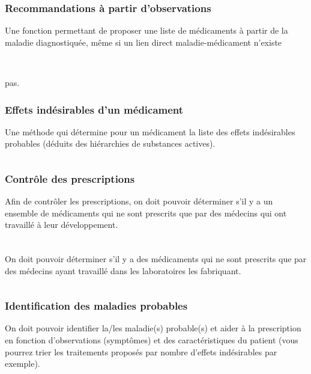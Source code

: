 \documentclass[12pt,a4paper]{article}
\begin{document}
\subsubsection{Recommandations à partir d'observations}
Une fonction permettant de proposer une liste de médicaments à partir de la maladie diagnostiquée, même si un lien direct maladie-médicament n’existe
\begin{lstlisting}[frame=single, language=SQL]
	
\end{lstlisting}pas.




\subsubsection{Effets indésirables d'un médicament}
Une méthode qui détermine pour un médicament la liste des effets indésirables probables (déduits des hiérarchies de substances actives).
\begin{lstlisting}[frame=single, language=SQL]

\end{lstlisting}



\subsubsection{Contrôle des prescriptions}
Afin de contrôler les prescriptions, on doit pouvoir déterminer s’il y a un ensemble de médicaments qui ne sont prescrits que par des médecins qui ont travaillé à leur développement.
\begin{lstlisting}[frame=single, language=SQL]

\end{lstlisting}



\subsubsection{}
On doit pouvoir déterminer s’il y a des médicaments qui ne sont prescrits que par des médecins ayant travaillé dans les laboratoires les fabriquant.
\begin{lstlisting}[frame=single, language=SQL]

\end{lstlisting}



\subsubsection{Identification des maladies probables}
On doit pouvoir identifier la/les maladie(s) probable(s) et aider à la prescription en fonction d’observations (symptômes) et des caractéristiques du patient (vous pourrez trier les traitements proposés par nombre d’effets indésirables par exemple).
\begin{lstlisting}[frame=single, language=SQL]

\end{lstlisting}
\end{document}
